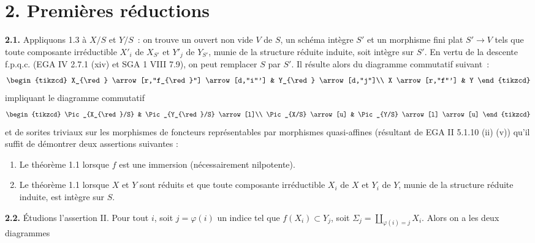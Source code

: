 \section*{2. Premières réductions}

\textbf{2.1.} Appliquons 1.3 à \(X/S\) et \(Y/S\)~: on trouve un ouvert non vide \(V\) de \(S\), un schéma intègre \(S'\) et un morphisme fini plat \(S'\to V\) tels que toute composante irréductible \(X'_i\) de \(X_{S'}\) et \(Y'_j\) de \(Y_{S'}\), munie de la structure réduite induite, soit intègre sur \(S'\). En vertu de la descente f.p.q.c. (EGA IV 2.7.1 (xiv) et SGA 1 VIII 7.9), on peut remplacer \(S\) par \(S'\). Il résulte alors du diagramme commutatif suivant~:
\[
\begin{tikzcd}
X_{\red} \arrow[r,"f_{\red}"] \arrow[d,"i"'] & Y_{\red} \arrow[d,"j"]\\
X \arrow[r,"f"'] & Y
\end{tikzcd}
\]
impliquant le diagramme commutatif
\[
\begin{tikzcd}
\Pic_{X_{\red}/S} & \Pic_{Y_{\red}/S} \arrow[l]\\
\Pic_{X/S} \arrow[u] & \Pic_{Y/S} \arrow[l] \arrow[u]
\end{tikzcd}
\]
et de sorites triviaux sur les morphismes de foncteurs représentables par morphismes quasi-affines (résultant de EGA II 5.1.10 (ii) (v)) qu'il suffit de démontrer deux assertions suivantes :
\begin{enumerate}[label=\Roman*.]
\item Le théorème 1.1 lorsque \(f\) est une immersion (nécessairement nilpotente).
\item Le théorème 1.1 lorsque \(X\) et \(Y\) sont réduits et que toute composante irréductible \(X_i\) de \(X\) et \(Y_i\) de \(Y\), munie de la structure réduite induite, est intègre sur \(S\).
\end{enumerate}

\textbf{2.2.} Étudions l'assertion II. Pour tout \(i\), soit \(j=\varphi(i)\) un indice tel que \(f(X_i)\subset Y_j\), soit \(\Sigma_j=\coprod_{\varphi(i)=j} X_i\). Alors on a les deux diagrammes
